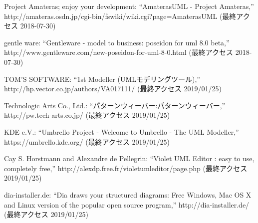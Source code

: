 \documentclass[uplatex, report, a4j, 10pt]{jsbook}
\begin{document}
\begin{thebibliography}{99}
   Project Amateras; enjoy your development: ``AmaterasUML - Project Amateras,'' http://amateras.osdn.jp/cgi-bin/fswiki/wiki.cgi?page=AmaterasUML (最終アクセス 2018-07-30)
  
   gentle ware: ``Gentleware - model to business: poseidon for uml 8.0 beta,'' http://www.gentleware.com/new-poseidon-for-uml-8-0.html (最終アクセス 2018-07-30)
  
   TOM'S SOFTWARE: ``1st Modeller (UMLモデリングツール),'' http://hp.vector.co.jp/authors/VA017111/ (最終アクセス 2019/01/25)
  
   Technologic Arts Co., Ltd.: ``パターンウィーバー:パターンウィーバー,'' http://pw.tech-arts.co.jp/ (最終アクセス 2019/01/25)
  
   KDE e.V.: ``Umbrello Project - Welcome to Umbrello - The UML Modeller,'' https://umbrello.kde.org/ (最終アクセス 2019/01/25)
  
   Cay S. Horstmann and Alexandre de Pellegrin: ``Violet UML Editor : easy to use, completely free,'' http://alexdp.free.fr/violetumleditor/page.php (最終アクセス 2019/01/25)
  
   dia-installer.de: ``Dia draws your structured diagrams: Free Windows, Mac OS X and Linux version of the popular open source program,'' http://dia-installer.de/ (最終アクセス 2019/01/25)
\end{thebibliography}

%
\end{document}
